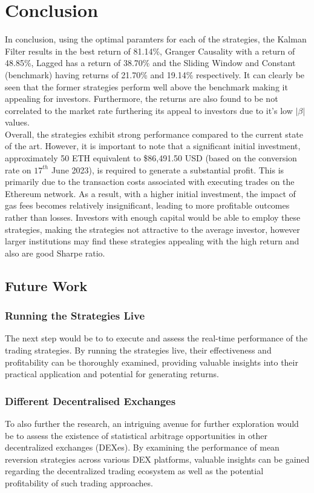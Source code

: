 \chapter{Conclusion}

In conclusion, using the optimal paramters for each of the strategies, the Kalman Filter results in the best return of 81.14\%, Granger Causality with a return of 48.85\%, Lagged has a return of 38.70\% and the Sliding Window and Constant (benchmark) having returns of  21.70\% and 19.14\% respectively. It can clearly be seen that the former strategies perform well above the benchmark making it appealing for investors. Furthermore, the returns are also found to be not correlated to the market rate furthering its appeal to investors due to it's low $|\beta|$ values.
\\[3mm]
Overall, the strategies exhibit strong performance compared to the current state of the art. However, it is important to note that a significant initial investment, approximately 50 ETH equivalent to \$86,491.50 USD (based on the conversion rate on $17^{th}$ June 2023), is required to generate a substantial profit. This is primarily due to the transaction costs associated with executing trades on the Ethereum network. As a result, with a higher initial investment, the impact of gas fees becomes relatively insignificant, leading to more profitable outcomes rather than losses. Investors with enough capital would be able to employ these strategies, making the strategies not attractive to the average investor, however larger institutions may find these strategies appealing with the high return and also are good Sharpe ratio.

\section{Future Work}

\subsection{Running the Strategies Live}
The next step would be to to execute and assess the real-time performance of the trading strategies. By running the strategies live, their effectiveness and profitability can be thoroughly examined, providing valuable insights into their practical application and potential for generating returns.

\subsection{Different Decentralised Exchanges}
To also further the research, an intriguing avenue for further exploration would be to assess the existence of statistical arbitrage opportunities in other decentralized exchanges (DEXes). By examining the performance of mean reversion strategies across various DEX platforms, valuable insights can be gained regarding the decentralized trading ecosystem as well as the potential profitability of such trading approaches.

